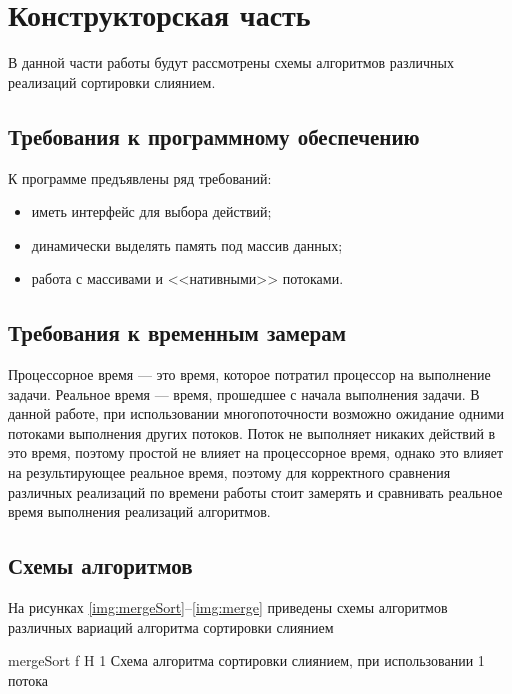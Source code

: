 \chapter{Конструкторская часть}
В данной части работы будут рассмотрены схемы алгоритмов различных реализаций сортировки слиянием.

\section{Требования к программному обеспечению}

К программе предъявлены ряд требований:

\begin{itemize}
	\item иметь интерфейс для выбора действий;
	\item динамически выделять память под массив данных;
	\item работа с массивами и <<нативными>> потоками.
\end{itemize}

\section{Требования к временным замерам}
Процессорное время --- это время, которое потратил процессор  на выполнение задачи.
Реальное время --- время, прошедшее с начала выполнения задачи. В данной работе, при использовании многопоточности возможно
ожидание одними потоками выполнения других потоков. Поток не выполняет
никаких действий в это время, поэтому простой не влияет на процессорное время, однако это влияет на результирующее реальное время, поэтому для корректного сравнения различных реализаций  по времени работы стоит замерять и сравнивать реальное время
выполнения реализаций алгоритмов.

\section{Схемы алгоритмов}

На рисунках \ref{img:mergeSort}--\ref{img:merge} приведены схемы алгоритмов различных вариаций алгоритма сортировки слиянием

{mergeSort} %
{f} %
{H} %
{1\textwidth} %
{Схема алгоритма сортировки слиянием, при использовании 1 потока} %

